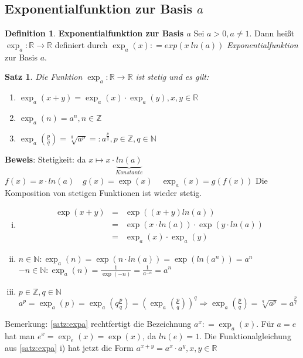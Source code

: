 \documentclass[ngerman,titlepage,twoside, parskip=half*]{scrreprt}
\newcommand*{\N}{\mathbb{N}}
\newcommand*{\Z}{\mathbb{Z}}
\newcommand*{\R}{\mathbb{R}}
\theoremstyle{plain}
\newtheorem{theorem}{Satz}[section]
\theoremstyle{definition}
\newtheorem{definition}{Definition}
\theoremstyle{remark}
\newcommand*{\coloneqq}{\mathrel{\mathop:}=}
\begin{document}
\subsection{Exponentialfunktion zur Basis \texorpdfstring{$a$}{a}}

\begin{definition}
\textbf{Exponentialfunktion zur Basis $a$} Sei $a>0, a\neq 1$. Dann heißt $\exp_a \colon\R\rightarrow\R$ definiert durch $\exp_a (x)\coloneqq
exp(x\ ln (a))$ \emph{Exponentialfunktion} zur Basis $a$.
\end{definition}

\begin{theorem}
\label{satz:expa}
Die Funktion $\exp_a \colon\R\rightarrow\R$ ist stetig und es gilt:
\begin{enumerate}[i]
  \item $\exp_a(x+y)=\exp_a(x)\cdot \exp_a(y), x,y \in \R$
  \item $\exp_a(n)=a^n, n\in \Z$
  \item $\exp_a (\frac{p}{q})=\sqrt[q]{a^p}=:a^{\frac{p}{q}}, p\in \Z , q\in \N$
\end{enumerate}
\end{theorem}
\textbf{Beweis}: Stetigkeit: da $x \mapsto x \cdot \underbrace{ln (a)}_{Konstante}$\\
$f(x)=x\cdot ln(a)\quad g(x)=\exp(x)\quad \exp_a(x)=g(f(x))$ Die Komposition von stetigen Funktionen ist wieder stetig.
\begin{enumerate}[i)]
  \item \begin{align*}
    \exp(x+y) & = & \exp((x+y)ln (a))\\
    & = & \exp(x \cdot ln (a))\cdot \exp(y\cdot ln(a))\\
    & = & \exp_a(x)\cdot \exp_a(y)
  \end{align*}
  \item $n\in \N\colon \exp_a (n)=\exp(n\cdot ln(a))=\exp(ln(a^n))=a^n$\\
    $-n\in \N\colon \exp_a(n)=\frac{1}{\exp(-n)}=\frac{1}{a^{-n}}=a^n$
  \item $p\in \Z, q\in \N$\\
    $a^p=\exp_a(p)=\exp_a(q\frac{p}{q})=\left(\exp_a(\frac{p}{q})\right)^q\Rightarrow \exp_a(\frac{p}{q})=\sqrt[q]{a^p}=a^{\frac{p}{q}}$
\end{enumerate}

Bemerkung: \autoref{satz:expa} rechtfertigt die Bezeichnung $a^x\coloneqq \exp_a(x)$. Für $a=e$ hat man $e^x=\exp_e(x)=\exp(x)$, 
da $ln(e)=1$. Die Funktionalgleichung aus \autoref{satz:expa} i) hat jetzt die Form $a^{x+y}=a^x\cdot a^y, x,y\in \R$
\end{document}
